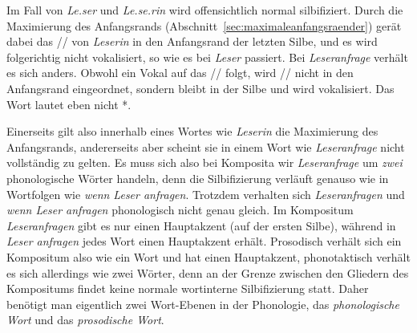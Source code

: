\begin{exe}
  \ex\label{ex:phol8945}
  \begin{xlist}
  \end{xlist}
\end{exe}

Im Fall von \textit{Le.ser} und \textit{Le.se.rin} wird offensichtlich normal silbifiziert.
Durch die Maximierung des Anfangsrands (Abschnitt~\ref{sec:maximaleanfangsraender}) gerät dabei das // von \textit{Leserin} in den Anfangsrand der letzten Silbe, und es wird folgerichtig nicht vokalisiert, so wie es bei \textit{Leser} passiert.
Bei \textit{Leseranfrage} verhält es sich anders.
Obwohl ein Vokal auf das // folgt, wird // nicht in den Anfangsrand eingeordnet, sondern bleibt in der Silbe \textipa{[z5]} und wird vokalisiert.
Das Wort lautet eben nicht *.

Einerseits gilt also innerhalb eines Wortes wie \textit{Leserin} die Maximierung des Anfangsrands, andererseits aber scheint sie in einem Wort wie \textit{Leseranfrage} nicht vollständig zu gelten.
Es muss sich also bei Komposita wir \textit{Leseranfrage} um \textit{zwei} phonologische Wörter handeln, denn die Silbifizierung verläuft genauso wie in Wortfolgen wie \textit{wenn Leser anfragen}.
Trotzdem verhalten sich \textit{Leseranfragen} und \textit{wenn Leser anfragen} phonologisch nicht genau gleich.
Im Kompositum \textit{Leseranfragen} gibt es nur einen Hauptakzent (auf der ersten Silbe), während in \textit{Leser anfragen} jedes Wort einen Hauptakzent erhält.
Prosodisch verhält sich ein Kompositum also wie ein Wort und hat einen Hauptakzent, phonotaktisch verhält es sich allerdings wie zwei Wörter, denn an der Grenze zwischen den Gliedern des Kompositums findet keine normale wortinterne Silbifizierung statt.
Daher benötigt man eigentlich zwei Wort-Ebenen in der Phonologie, das \textit{phonologische Wort} und das \textit{prosodische Wort}.


